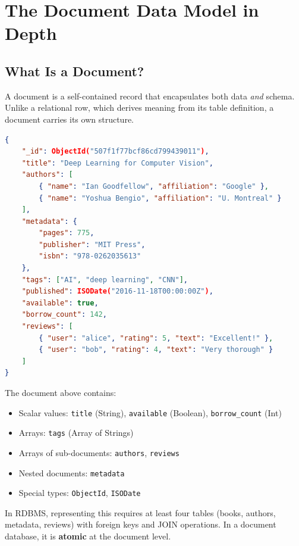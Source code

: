 \documentclass[12pt,a4paper]{article}
\begin{document}
\section{The Document Data Model in Depth}

\subsection{What Is a Document?}

A document is a self-contained record that encapsulates both data \textit{and} schema. Unlike a relational row, which derives meaning from its table definition, a document carries its own structure.

\begin{lstlisting}[language=json, caption={A MongoDB-style Document Representing a Book}]
{
    "_id": ObjectId("507f1f77bcf86cd799439011"),
    "title": "Deep Learning for Computer Vision",
    "authors": [
        { "name": "Ian Goodfellow", "affiliation": "Google" },
        { "name": "Yoshua Bengio", "affiliation": "U. Montreal" }
    ],
    "metadata": {
        "pages": 775,
        "publisher": "MIT Press",
        "isbn": "978-0262035613"
    },
    "tags": ["AI", "deep learning", "CNN"],
    "published": ISODate("2016-11-18T00:00:00Z"),
    "available": true,
    "borrow_count": 142,
    "reviews": [
        { "user": "alice", "rating": 5, "text": "Excellent!" },
        { "user": "bob", "rating": 4, "text": "Very thorough" }
    ]
}
\end{lstlisting}

\begin{keyinsight}
The document above contains:
\begin{itemize}[noitemsep]
    \item Scalar values: \texttt{title} (String), \texttt{available} (Boolean), \texttt{borrow\_count} (Int)
    \item Arrays: \texttt{tags} (Array of Strings)
    \item Arrays of sub-documents: \texttt{authors}, \texttt{reviews}
    \item Nested documents: \texttt{metadata}
    \item Special types: \texttt{ObjectId}, \texttt{ISODate}
\end{itemize}
In RDBMS, representing this requires at least four tables (books, authors, metadata, reviews) with foreign keys and JOIN operations. In a document database, it is \textbf{atomic} at the document level.
\end{keyinsight}
\end{document}
